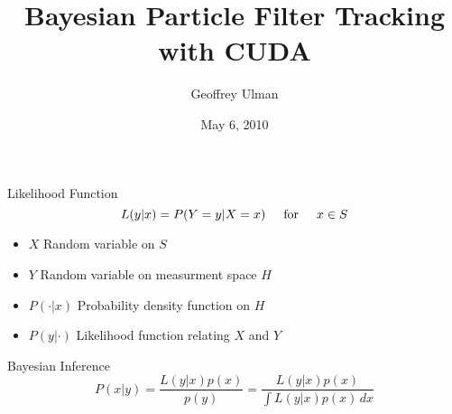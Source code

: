 \documentclass{beamer}
\title{Bayesian Particle Filter Tracking with CUDA}
\author{Geoffrey Ulman}
\date{May 6, 2010}
\begin{document}

\begin{frame}
\titlepage
\end{frame}


\begin{frame}{Likelihood Function}
\begin{equation}
L(y|x) = P( Y=y | X=x ) \hspace{0.5cm} \mbox{for} \hspace{0.5cm} x \in S
\end{equation}

\vspace{1cm}

\begin{itemize}
\item \(X\) Random variable on \(S\)
\item \(Y\) Random variable on measurment space \(H\)
\item \(P(\cdot|x)\) Probability density function on \(H\)
\item \(P(y|\cdot)\) Likelihood function relating \(X\) and \(Y\)
\end{itemize}

\end{frame}


\begin{frame}{Bayesian Inference}
\begin{equation}
P(x|y) = \frac{L(y|x)p(x)}{p(y)} = \frac{L(y|x)p(x)}{\int \! L(y|x)p(x) \, dx}
\end{equation}
\end{frame}

\end{document}
